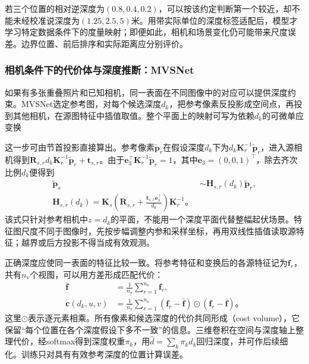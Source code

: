 若三个位置的相对逆深度为$(0.8,0.4,0.2)$，可以按该约定判断第一个较近，却不能未经校准说深度为$(1.25,2.5,5)$米。用带实际单位的深度标签适配后，模型才学习特定数据条件下的度量映射；即便如此，相机和场景变化仍可能带来尺度误差。边界位置、前后排序和实际距离应分别评价。

\subsubsection{相机条件下的代价体与深度推断：MVSNet}
\label{sec:vision-recognition-mvsnet}

如果有多张重叠照片和已知相机，同一表面在不同图像中的对应可以提供深度约束。MVSNet选定参考图，对每个候选深度$d_k$，把参考像素反投影成空间点，再投到其他相机，在源图特征中插值取值。整个平面上的映射可写为依赖$d_k$的可微单应变换

这一步可由节首投影直接算出。参考像素$\tilde{\bm p}_r$在假设深度$d_k$下为$d_k\bm K_r^{-1}\tilde{\bm p}_r$，进入源相机得到$\bm R_{s,r}d_k\bm K_r^{-1}\tilde{\bm p}_r+\bm t_{s,r}$。由于$\bm e_3^\top\bm K_r^{-1}\tilde{\bm p}_r=1$，其中$\bm e_3=(0,0,1)^\top$，除去齐次比例$d_k$便得到
\begin{equation}
 \begin{aligned}
 \tilde{\bm p}_s&\sim\bm H_{s,r}(d_k)\tilde{\bm p}_r,\\
 \bm H_{s,r}(d_k)=
 \bm K_s\left(\bm R_{s,r}
 +\frac{\bm t_{s,r}\bm e_3^\top}{d_k}\right)\bm K_r^{-1}\text{。}
 \end{aligned}
 \label{eq:vision-mvsnet-homography-process}
\end{equation}
该式只针对参考相机中$z=d_k$的平面，不能用一个深度平面代替整幅起伏场景。特征图尺度不同于图像时，先按步幅调整内参和采样坐标，再用双线性插值读取源特征；越界或后方投影不得当成有效观测。

正确深度应使同一表面的特征比较一致。将参考特征和变换后的各源特征记为$\bm{f}_r$，共有$n_{\mathrm{v}}$个视图，可以用方差形成匹配代价：
\begin{equation}
 \begin{aligned}
 \bar{\bm{f}}&=\frac1{n_{\mathrm{v}}}\sum_{r=1}^{n_{\mathrm{v}}}\bm{f}_r,\\
 \bm{c}(d_k,u,v)&=\frac1{n_{\mathrm{v}}}\sum_{r=1}^{n_{\mathrm{v}}}
   (\bm{f}_r-\bar{\bm{f}})\odot(\bm{f}_r-\bar{\bm{f}})\text{。}
 \end{aligned}
 \label{eq:vision-mvs-cost}
\end{equation}
这里$\odot$表示逐元素相乘。所有像素和候选深度的代价共同形成（cost volume），它保留“每个位置在各个深度假设下多不一致”的信息。三维卷积在空间与深度轴上整理代价，经softmax得到深度权重$\pi_k$，用$\hat d=\sum_k\pi_kd_k$回归深度，并可作后续细化。训练只对具有有效参考深度的位置计算误差。

